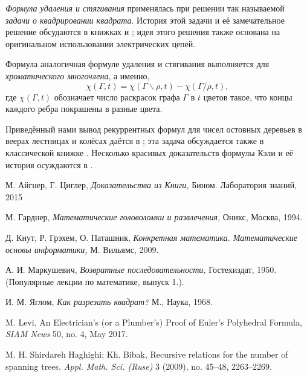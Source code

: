 \documentclass{article}
\begin{document}
\emph{Формула удаления и стягивания} применялась при решении так называемой \emph{задачи о квадрировании квадрата}.
История этой задачи и её замечательное решение обсудаются в книжках \cite{yaglom} и \cite[Глава 32]{gardner};
идея этого решения также основана на оригинальном использовании электрических цепей.

Формула аналогичная формуле удаления и стягивания выполняется для \emph{хроматического многочлена}, а именно,
\[\chi(\Gamma,t)=\chi(\Gamma\backslash\rho,t)-\chi(\Gamma/\rho,t),\] 
где $\chi(\Gamma,t)$ обозначает число раскрасок графа $\Gamma$ в $t$ цветов такое, что концы каждого ребра покрашены в разные цвета.

Приведённый нами вывод рекуррентных формул для чисел ос\-тов\-ных деревьев в веерах лестницах и колёсах даётся в \cite{haghighi-bibak};
эта задача обсуждается также в классической книжке \cite{knut}.
Несколько красивых доказательств формулы Кэли и её история осуждаются в \cite[Глава 30]{aigner-ziegler}.

\begin{thebibliography}{52}

 М. Айгнер, Г. Циглер, 
\emph{Доказательства из Книги,} 
Бином. Лаборатория знаний, 2015 

 М. Гарднер, \emph{Математические головоломки и развлечения,}  Оникс, Москва, 1994.

Д. Кнут, Р. Грэхем, О. Паташник,
\emph{Конкретная математика. Математические основы информатики,}
М. Вильямс, 
2009.

А. И. Маркушевич,
\emph{Возвратные последовательности,} 
Гостехиздат, 1950. (Популярные лекции по математике, выпуск 1.).


И. М. Яглом,
\emph{Как разрезать квадрат?}
М., Наука, 1968.

 M. Levi,
An Electrician’s (or a Plumber’s)
Proof of Euler’s Polyhedral Formula,
\emph{SIAM News} 50, no. 4, May 2017.


 M. H. Shirdareh Haghighi; Kh. Bibak, 
Recursive relations for the number of spanning trees. 
\emph{Appl. Math. Sci. (Ruse)} 3 (2009), no. 45--48, 2263--2269. 
\end{thebibliography}
\end{document}

